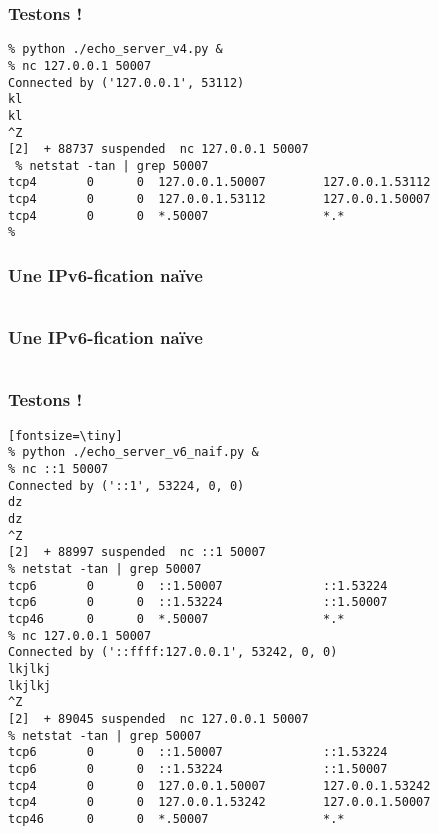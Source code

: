 \begin{frame}[fragile]{}
	\frametitle{Testons !}
	
	\begin{verbatim}
% python ./echo_server_v4.py &
% nc 127.0.0.1 50007
Connected by ('127.0.0.1', 53112)
kl
kl
^Z
[2]  + 88737 suspended  nc 127.0.0.1 50007
 % netstat -tan | grep 50007
tcp4       0      0  127.0.0.1.50007        127.0.0.1.53112 
tcp4       0      0  127.0.0.1.53112        127.0.0.1.50007 
tcp4       0      0  *.50007                *.*             
%
	\end{verbatim}

\end{frame}

\begin{frame}[fragile]{}
	\frametitle{Une IPv6-fication naïve}
    \begin{minipage}{0.5\textwidth}
      \inputminted[mathescape,
        fontsize=\scriptsize,
        framesep=2mm]{diff}{../echo_server_v4_v6.diff}
    \end{minipage}
\end{frame}


\begin{frame}[fragile]{}
	\frametitle{Une IPv6-fication naïve}
    \begin{minipage}{0.5\textwidth}
      \inputminted[mathescape,
        linenos,
        fontsize=\scriptsize,
        framesep=2mm]{python}{../echo_server_v6_naif.py}
    \end{minipage}
\end{frame}



\begin{frame}[fragile]{}
	\frametitle{Testons !}
	
	\begin{verbatim}[fontsize=\tiny]
% python ./echo_server_v6_naif.py &
% nc ::1 50007 
Connected by ('::1', 53224, 0, 0)
dz
dz
^Z
[2]  + 88997 suspended  nc ::1 50007
% netstat -tan | grep 50007
tcp6       0      0  ::1.50007              ::1.53224
tcp6       0      0  ::1.53224              ::1.50007
tcp46      0      0  *.50007                *.*             
% nc 127.0.0.1 50007
Connected by ('::ffff:127.0.0.1', 53242, 0, 0)
lkjlkj
lkjlkj
^Z
[2]  + 89045 suspended  nc 127.0.0.1 50007
% netstat -tan | grep 50007
tcp6       0      0  ::1.50007              ::1.53224       
tcp6       0      0  ::1.53224              ::1.50007       
tcp4       0      0  127.0.0.1.50007        127.0.0.1.53242 
tcp4       0      0  127.0.0.1.53242        127.0.0.1.50007 
tcp46      0      0  *.50007                *.*             
	\end{verbatim}

\end{frame}


\frame{
	\frametitle{}
	\begin{itemize}
		\item
	\end{itemize}
}


